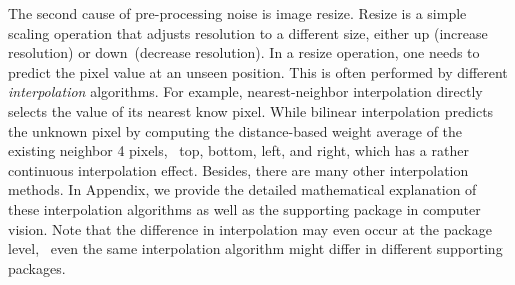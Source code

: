 

The second cause of pre-processing noise is image resize. Resize is a simple scaling operation that adjusts resolution to a different size, either up (increase resolution) or down~(decrease resolution). In a resize operation, one needs to predict the pixel value at an unseen position. This is often performed by different \textit{interpolation} algorithms. 
For example, nearest-neighbor interpolation directly selects the value of its nearest know pixel. While bilinear interpolation predicts the unknown pixel by computing the distance-based weight average of the existing neighbor 4 pixels, \ie~top, bottom, left, and right, which has a rather continuous interpolation effect. 
Besides, there are many other interpolation methods. In Appendix, we provide the detailed mathematical explanation of these interpolation algorithms as well as the supporting package in computer vision. Note that the difference in interpolation may even occur at the package level, \ie~even the same interpolation algorithm might differ in different supporting packages.

